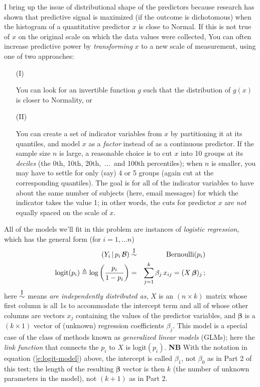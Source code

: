 \documentclass[12pt]{article}
\newcommand{\given}{\, | \,}
\begin{document}
I bring up the issue of distributional shape of the predictors because research has shown that predictive signal is maximized (if the outcome is dichotomous) when the histogram of a quantitative predictor $x$ is close to Normal. If this is not true of $x$ on the original scale on which the data values were collected, You can often increase predictive power by \textit{transforming} $x$ to a new scale of measurement, using one of two approaches:

\begin{itemize}

\item[(I)]

You can look for an invertible function $g$ such that the distribution of $g ( x )$ is closer to Normality, or

\item[(II)]

You can create a set of indicator variables from $x$ by partitioning it at its quantiles, and model $x$ as a \textit{factor} instead of as a continuous predictor. If the sample size $n$ is large, a reasonable choice is to cut $x$ into 10 groups at its \textit{deciles} (the 0th, 10th, 20th,~...~and 100th percentiles); when $n$ is smaller, you may have to settle for only (say) 4 or 5 groups (again cut at the corresponding quantiles). The goal is for all of the indicator variables to have about the same number of subjects (here, email messages) for which the indicator takes the value 1; in other words, the cuts for predictor $x$ are \textit{not} equally spaced on the scale of $x$.

\end{itemize}

All of the models we'll fit in this problem are instances of \textit{logistic regression}, which has the general form (for $i = 1, \dots n$)
\begin{eqnarray} \label{e:logit-model}
( Y_i \given p_i \, \mathcal{ B } ) & \stackrel{ \text{\footnotesize I} }{ \sim } & \text{Bernoulli} ( p_i ) \nonumber \\
\text{logit} ( p_i ) \triangleq \log \left( \frac{ p_i }{ 1 - p_i } \right) & = & \sum_{ j = 1 }^k \beta_j \, x_{ ij } = ( X \, \bm{ \beta } )_j \, ;
\end{eqnarray}
here $\stackrel{ \text{\footnotesize I} }{ \sim }$ means \textit{are independently distributed as}, $X$ is an $( n \times k )$ matrix whose first column is all 1s to accommodate the intercept term and all of whose other columns are vectors $x_j$ containing the values of the predictor variables, and $\bm{ \beta }$ is a $( k \times 1 )$ vector of (unknown) regression coefficients $\beta_j$. This model is a special case of the class of methods known as \textit{generalized linear models} (GLMs); here the \textit{link function} that connects the $p_i$ to $X$ is logit$( p_i )$. \textbf{NB} With the notation in equation (\ref{e:logit-model}) above, the intercept is called $\beta_1$, not $\beta_0$ as in Part 2 of this test; the length of the resulting $\bm{ \beta }$ vector is then $k$ (the number of unknown parameters in the model), not $( k + 1 )$ as in Part 2.
\end{document}
